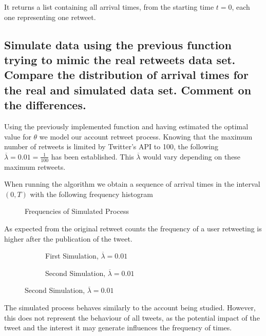 \documentclass[11pt, a4paper]{article}
\begin{document}
It returns a list containing all arrival times, from the starting time $t=0$, each one representing one retweet. 

\subsection{Simulate data using the previous function trying to mimic the real retweets data set. Compare the distribution of arrival times for the real and simulated data set. Comment on the differences.}

Using the previously implemented function and having estimated the optimal value for $\theta$ we model our account retweet process. Knowing that the maximum number of retweets is limited by Twitter's API to 100, the following $\overline \lambda=0.01 = \frac{1}{100}$ has been established. This $\overline \lambda$ would vary depending on these maximum retweets.

When running the algorithm we obtain a sequence of arrival times in the interval $(0, T)$ with the following frequency histogram

\begin{figure}[H]
	\centering
	\vspace*{-3.5em}
	\scalebox{.8}{}
	\vspace*{-1.5em}
	\caption{Frequencies of Simulated Process}
\end{figure}

As expected from the original retweet counts the frequency of a user retweeting is higher after the publication of the tweet. 

\begin{figure}[H]
	\centering
	\begin{subfigure}{.5\textwidth}
		\centering
		
		\caption{First Simulation, $\overline\lambda=0.01$}
		\label{fig:sim1}
	\end{subfigure}%
	\begin{subfigure}{.5\textwidth}
		\centering
		
		\caption{Second Simulation, $\overline\lambda=0.01$}
		\label{fig:sim2}
	\end{subfigure}
\end{figure}

The simulated process behaves similarly to the account being studied. However, this does not represent the behaviour of all tweets, as the potential impact of the tweet and the interest it may generate influences the frequency of times.
\end{document}
